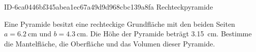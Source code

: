 \begin{exercise}
      {ID-6ca0446bf345abea1ec67a49d9d968cbc139a8fa}
      {Rechteckpyramide}
  \ifproblem\problem\par
    Eine Pyramide besitzt eine rechteckige
    Grundfläche mit den beiden Seiten
    $a=\SI{6.2}{\centi\metre}$ und
    $b=\SI{4.3}{\centi\metre}$.
    Die Höhe der Pyramide beträgt
    \SI{3.15}{\centi\metre}.
    Bestimme die Mantelfläche, die Oberfläche und
    das Volumen dieser Pyramide.
  \fi
\end{exercise}
